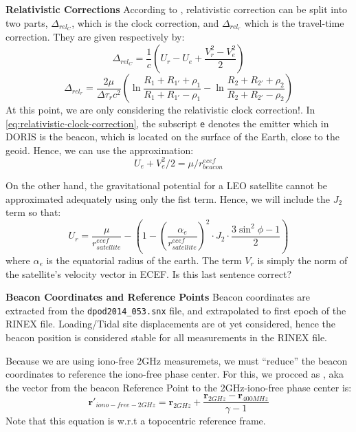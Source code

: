 \textbf{Relativistic Corrections}
According to \cite{lemoine-2016}, relativistic correction can be split into two 
parts, $\Delta_{rel_C}$, which is the clock correction, and $\Delta_{rel_r}$ 
which is the travel-time correction. They are given respectively by:
\begin{equation}
  \label{eq:relativistic-clock-correction}
  \Delta_{rel_C} = \frac{1}{c} \left( U_r - U_e + \frac{V_r^2 -V_e^2}{2} \right)
\end{equation}
\begin{equation}
  \Delta_{rel_r} = \frac{2\mu}{\Delta \tau _r c^2} 
    \left( \ln{\frac{R_1+R_{1'}+\rho_1}{R_1+R_{1'}-\rho_1}} 
      - \ln{\frac{R_2+R_{2'}+\rho_2}{R_2+R_{2'}-\rho_2}} \right)
\end{equation}
{\color{brown}At this point, we are only considering the relativistic clock correction!}.
In \ref{eq:relativistic-clock-correction}, the subscript \texttt{e} denotes the 
emitter which in DORIS is the beacon, which is located on the surface of the 
Earth, close to the geoid. Hence, we can use the approximation:
\begin{equation}
  U_e + V_e^2 / 2 = \mu / r_{beacon}^{ecef}
\end{equation}

On the other hand, the gravitational potential for a LEO satellite cannot be 
approximated adequately using only the fist term. Hence, we will include the 
$J_2$ term so that:
\begin{equation}
  U_r = \frac{\mu}{r_{satellite}^{ecef}} - 
    \left( 1 - \left( \frac{\alpha _e}{r_{satellite}^{ecef}} \right) ^2 
      \cdot J_2 \cdot \frac{3 \sin^{2}{\phi} -1}{2} \right)
\end{equation}
where $\alpha _e$ is the equatorial radius of the earth. The term $V_r$ is 
simply the norm of the satellite's {\color{brown}velocity vector in ECEF}.
Is this last sentence correct?

\textbf{Beacon Coordinates and Reference Points}
\label{beacon-coordiates-and-reference-points}
Beacon coordinates are extracted from the \texttt{dpod2014\_053.snx} file, and 
extrapolated to first epoch of the RINEX file. {\color{brown} Loading/Tidal site 
displacements are ot yet considered}, hence the beacon position is considered 
stable for all measurements in the RINEX file.

Because we are using iono-free 2GHz measuremets, we must ``reduce'' the beacon 
coordinates to reference the iono-free phase center. For this, we procced as 
\cite{lemoine-2016}, aka the vector from the beacon Reference Point to the
2GHz-iono-free phase center is:
\begin{equation}
  \bm{r}'_{iono-free-2GHz} = \bm{r}_{2GHz} + 
    \frac{\bm{r}_{2GHz} - \bm{r}_{400MHz}}{\gamma - 1}
\end{equation}
Note that this equation is w.r.t a topocentric reference frame.

